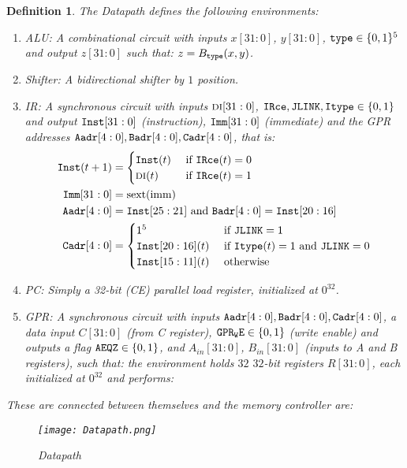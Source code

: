 \documentclass[12pt]{article}
\newcommand{\scr}[1]{{\scriptstyle\textup{#1}}}
\newcommand{\scrf}[1]{{\scriptstyle\textup{\footnotesize #1}}}
\DeclareMathOperator{\NOT}{\scr{NOT}}
\DeclareMathOperator{\OR}{\scr{OR}}
\newcommand*{\B}{\{0,1\}}
\newcommand{\repr}[1]{\langle{#1}\rangle}
\newtheorem{definition}[theorem]{Definition}
\begin{document}
\begin{definition}
  The Datapath defines the following environments:
  \begin{enumerate}
    \item ALU: A combinational circuit with inputs $x[31:0]$, $y[31:0]$, ${\tt type}\in\B^5$ and output $z[31:0]$ such that: $z=B_{\tt type}(x,y)$.
    \item Shifter: A bidirectional shifter by $1$ position.
    \item IR: A synchronous circuit with inputs $\scrf{DI}[31:0]$, ${\tt IRce},{\tt JLINK},  {\tt Itype}\in\B$ and output ${\tt Inst}[31:0]$ (instruction), ${\tt Imm}[31:0]$ (immediate) and the GPR addresses ${\tt Aadr}[4:0],{\tt Badr}[4:0],{\tt Cadr}[4:0]$, that is: 
    \begin{align*}
      {\tt Inst}(t+1)&=\begin{cases}
        {\tt Inst}(t)&\text{ if }{\tt IRce}(t)=0\\
        \scrf{DI}(t)&\text{ if }{\tt IRce}(t)=1
      \end{cases}\\
      {\tt Imm}[31:0]&=\text{sext}(\text{imm})\\
      {\tt Aadr}[4:0]&={\tt Inst}[25:21]\text{ and }{\tt Badr}[4:0]={\tt Inst}[20:16]\\
      {\tt Cadr}[4:0]&=\begin{cases}
        1^5 &\text{ if }{\tt JLINK}=1\\
        {\tt Inst}[20:16](t)&\text{ if }{\tt Itype}(t)=1\text{ and }{\tt JLINK}=0\\
        {\tt Inst}[15:11](t)&\text{ otherwise}
      \end{cases}
    \end{align*}
    \item PC: Simply a 32-bit (CE) parallel load register, initialized at $0^{32}$.
    \item GPR: A synchronous circuit with inputs ${\tt Aadr}[4:0],{\tt Badr}[4:0],{\tt Cadr}[4:0]$, a data input $C[31:0]$ (from C register), ${\tt GPR_WE}\in\B$ (write enable) and outputs a flag ${\tt AEQZ}\in\B$, and $A_{in}[31:0]$, $B_{in}[31:0]$ (inputs to A and B registers), such that: the environment holds $32$ $32$-bit registers $R[31:0]$, each initialized at $0^{32}$ and performs:
  \end{enumerate}
  These are connected between themselves and the memory controller are:
  \begin{figure}[H]
    \centering
    \texttt{[image: Datapath.png]}
    \caption{Datapath}
    \label{datapath}
  \end{figure}
\end{definition}
\end{document}
